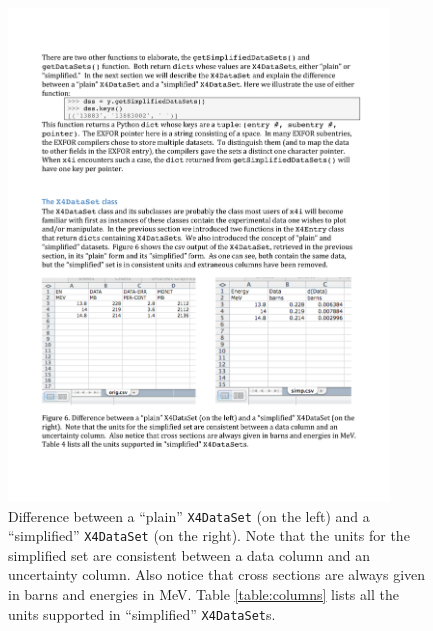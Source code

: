 \documentclass[11pt]{article}
\begin{document}
\begin{figure}[htbp]
\begin{center}
\includegraphics[width=0.9\textwidth]{figs/figure6}
\caption{\label{fig:6}Difference between a ``plain''  \texttt{X4DataSet} (on the left) and a ``simplified'' \texttt{X4DataSet} (on the right).  Note that the units for the simplified set are consistent between a data column and an uncertainty column.  Also notice that cross sections are always given in barns and energies in MeV.  Table \ref{table:columns} lists all the units supported in ``simplified'' \texttt{X4DataSet}s.}
\end{center}
\end{figure}
\end{document}

